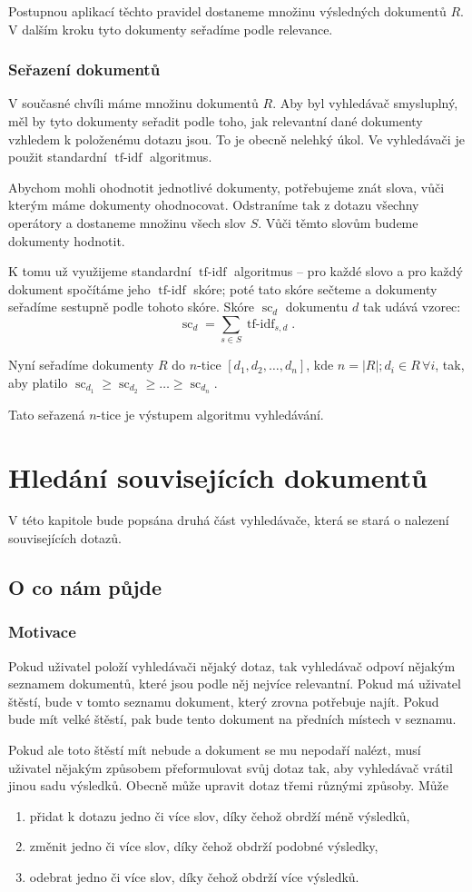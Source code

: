 \documentclass[12pt]{article}
\newcommand{\ssection}[1]{\subsection{#1}}
\newcommand{\sssection}[1]{\subsubsection{#1}}
\newcommand{\addh}[1]{\left[#1\right]}
\DeclareMathOperator{\tfidf}{tf-idf}
\DeclareMathOperator{\score}{sc}
\begin{document}
Postupnou aplikací těchto pravidel dostaneme množinu výsledných dokumentů $R$. V dalším kroku tyto dokumenty seřadíme podle relevance. 

\sssection{Seřazení dokumentů}

V současné chvíli máme množinu dokumentů $R$. Aby byl vyhledávač smysluplný, měl by tyto dokumenty seřadit podle toho, jak relevantní dané dokumenty vzhledem k položenému dotazu jsou. To je obecně nelehký úkol. Ve vyhledávači je použit standardní $\tfidf$ algoritmus. 

Abychom mohli ohodnotit jednotlivé dokumenty, potřebujeme znát slova, vůči kterým máme dokumenty ohodnocovat. Odstraníme tak z dotazu všechny operátory a dostaneme množinu všech slov $S$. Vůči těmto slovům budeme dokumenty hodnotit. 

K tomu už využijeme standardní $\tfidf$ algoritmus -- pro každé slovo a pro každý dokument spočítáme jeho $\tfidf$ skóre; poté tato skóre sečteme a dokumenty seřadíme sestupně podle tohoto skóre. Skóre $\score_d$ dokumentu $d$ tak udává vzorec:
$$\score_d=\sum_{s\in S} \tfidf_{s, d}.$$

Nyní seřadíme dokumenty $R$ do $n$-tice $\addh{d_1, d_2, \ldots, d_n}$, kde $n=|R|; d_i\in R \,\forall i$, tak, aby platilo $\score_{d_1} \ge \score_{d_2} \ge \ldots \ge \score_{d_n}$.

Tato seřazená $n$-tice je výstupem algoritmu vyhledávání. 


\newpage
\section{Hledání souvisejících dokumentů}
V této kapitole bude popsána druhá část vyhledávače, která se stará o nalezení souvisejících dotazů. 

\ssection{O co nám půjde}

\sssection{Motivace}

Pokud uživatel položí vyhledávači nějaký dotaz, tak vyhledávač odpoví nějakým seznamem dokumentů, které jsou podle něj nejvíce relevantní. Pokud má uživatel štěstí, bude v tomto seznamu dokument, který zrovna potřebuje najít. Pokud bude mít velké štěstí, pak bude tento dokument na předních místech v seznamu. 

Pokud ale toto štěstí mít nebude a dokument se mu nepodaří nalézt, musí uživatel nějakým způsobem přeformulovat svůj dotaz tak, aby vyhledávač vrátil jinou sadu výsledků. Obecně může upravit dotaz třemi různými způsoby. Může

\begin{enumerate}
\item přidat k dotazu jedno či více slov, díky čehož obrdží méně výsledků,
\item změnit jedno či více slov, díky čehož obdrží podobné výsledky,
\item odebrat jedno či více slov, díky čehož obdrží více výsledků.
\end{enumerate}
\end{document}
